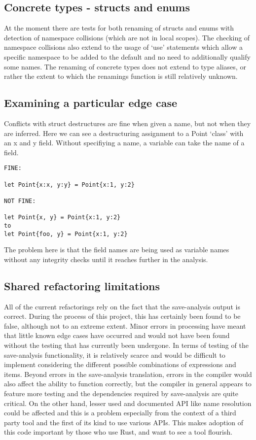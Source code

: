 \subsection{Concrete types - structs and enums}
At the moment there are tests for both renaming of structs and enums with detection of namespace collisions (which are not in local scopes). The checking of namespace collisions also extend to the usage of `use' statements which allow a specific namespace to be added to the default and no need to additionally qualify some names. The renaming of concrete types does not extend to type aliases, or rather the extent to which the renamings function is still relatively unknown.

\subsection{Examining a particular edge case}

Conflicts with struct destructures are fine when given a name, but not when they are inferred. Here we can see a destructuring assignment to a Point `class' with an x and y field. Without specifiying a name, a variable can take the name of a field. 
\begin{verbatim}
FINE:

let Point{x:x, y:y} = Point{x:1, y:2}

NOT FINE:

let Point{x, y} = Point{x:1, y:2}
to 
let Point{foo, y} = Point{x:1, y:2}
\end{verbatim}
The problem here is that the field names are being used as variable names without any integrity checks until it reaches further in the analysis. 

\subsection{Shared refactoring limitations}
All of the current refactorings rely on the fact that the save-analysis output is correct. During the process of this project, this has certainly been found to be false, although not to an extreme extent. Minor errors in processing have meant that little known edge cases have occurred and would not have been found without the testing that has currently been undergone. In terms of testing of the save-analysis functionality, it is relatively scarce and would be difficult to implement considering the different possible combinations of expressions and items. Beyond errors in the save-analysis translation, errors in the compiler would also affect the ability to function correctly, but the compiler in general appears to feature more testing and the dependencies required by save-analysis are quite critical. On the other hand, lesser used and documented API like name resolution could be affected and this is a problem especially from the context of a third party tool and the first of its kind to use various APIs. This makes adoption of this code important by those who use Rust, and want to see a tool flourish.

